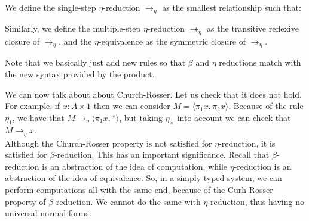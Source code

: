\begin{definition}\label{def:eta_x}
  We define the single-step $\eta$-reduction $\to_\eta$ as the smallest relationship such that: 
  \begin{itemize}
  \item[]$(\eta)$: $(\lambda x^t.Mx) \to_\eta M}$,para todo $ x \not  \in FV(M)$.\\
\item[]$(\eta_1)$: $\langle\pi_1 M, \pi_2 M\rangle\to_\eta M$.\\
\item[]$(\eta_\times)$: If $M:1$ then $M \to_\eta *$ . \\
\item[]$(\operatorname{cong}_1)$: If $ M \to_\eta M'$ then $MN \to_\eta M'N$.\\
\item[]$(\operatorname{cong}_2)$: If $ N \to_\eta N'$ then $ MN \to_\eta MN'$.\\
\item[]$(\zeta)$: If $M\to_\eta M'$ then $(\lambda x.M) \to_\eta \lambda x.M'$.\\
\end{itemize}

Similarly, we define the multiple-step $\eta$-reduction $\twoheadrightarrow_\eta$ as the transitive reflexive closure of $\to_\eta$, and the $\eta$-equivalence as the symmetric closure of $\twoheadrightarrow_\eta$.
\end{definition}

\begin{remark} Note that we basically just add new rules so that $\beta$ and $\eta$ reductions match with the new syntax provided by the product.
\end{remark} 
We can now talk about about Church-Rosser.  Let us check that it does not hold. For example, if $x: A\times 1$ then we can consider $M=\langle \pi_1x, \pi_2x\rangle$. Because of the rule $\eta_1$, we have that $M \to_{\eta}\langle \pi_1 x, *\rangle$, but taking $\eta_\times$ into account we can check that $M \to_{\eta} x$. \\

Although the Church-Rosser property is not satisfied for $\eta$-reduction, it is satisfied for $\beta$-reduction. This has an important significance. Recall that $\beta$-reduction is an abstraction of the idea of computation, while $\eta$-reduction is an abstraction of the idea of equivalence. So, in a simply typed system, we can perform computations all with the same end, because of the Curh-Rosser property of $\beta$-reduction. We cannot do the same with $\eta$-reduction, thus having no universal normal forms.

